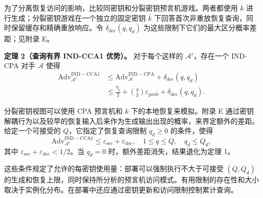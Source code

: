 为了分离恢复访问的影响，比较同密钥和分裂密钥预言机游戏。两者都使用 \(k\) 进行生成；分裂密钥游戏在一个独立的固定密钥 \(\bar{k}\) 下回答首次非重放恢复查询，同时保留缓存和精确重放响应。令 \(\delta_{\mathrm{dec}}(q, q_d)\) 为这些限制下它们的最大区分概率差距；见附录 E。

\textbf{定理 2（查询有界 IND-CCA1 优势）。} 对于每个这样的 \(\mathcal{A}'\)，存在一个 IND-CPA 对手 \(\mathcal{A}\) 使得
\begin{equation}
\begin{aligned}
\mathrm{Adv}_{\mathcal{A}'}^{\mathrm{IND-CCA1}} &\le \mathrm{Adv}_{\mathcal{A}}^{\mathrm{IND-CPA}} + \delta_{\mathrm{dec}}(q, q_d) \\
&\le \frac{\eta_q}{2} + \binom{q}{2} \varepsilon_{\mathrm{prob}} + \delta_{\mathrm{dec}}(q, q_d).
\end{aligned} \tag{19}
\end{equation}

分裂密钥视图可以使用 CPA 预言机和 \(k\) 下的本地恢复来模拟。附录 E 通过密钥解耦行为以及较早的恢复输入后来作为生成输出出现的概率，来界定额外的差距。给定一个可接受的 \(Q\)，它指定了恢复查询限制 \(q_d \ge 0\) 的条件，使得
\begin{equation}
\mathrm{Adv}_{\mathcal{A}'}^{\mathrm{IND-CCA1}} \le \varepsilon_{\mathrm{sec}} + \varepsilon_{\mathrm{dec}}, \quad 1 \le q \le Q, \quad q_d \le Q_d, \tag{20}
\end{equation}
其中 \(\varepsilon_{\mathrm{sec}} + \varepsilon_{\mathrm{dec}} < 1/2\)。当 \(q_d = 0\) 时，额外差距消失，结果退化为定理 1。

这些条件规定了允许的每密钥使用量：部署可以强制执行不大于可接受 \((Q, Q_d)\) 的生成和恢复上限，同时保持所分析的预言机访问模式。有用限制的存在性和大小取决于实例化分布。在部署中还应通过密钥更新和访问限制控制累计查询。
